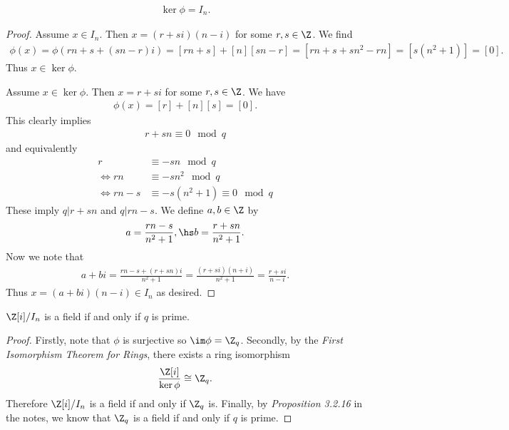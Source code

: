 \documentclass{article}
\begin{document}
\begin{claim*}[4]
   \begin{align*}
      \ker\phi = I_n.
   \end{align*} 
   \begin{proof}
      Assume $x\in I_n$. Then $x=(r+si)(n-i)$ for some $r,s\in\Z$. We find 
      \begin{align*}
         \phi(x)=\phi(rn + s + (sn - r)i) = [rn + s] + [n][sn -r] = [rn + s + sn^2 -rn] = [s(n^2+1)] = [0].
      \end{align*}
      Thus $x\in\ker\phi$.

      Assume $x\in\ker\phi$. Then $x=r+si$ for some $r,s\in\Z$. We have
      \begin{align*}
         \phi(x) = [r] + [n][s] = [0].
      \end{align*}
      This clearly implies 
      \begin{align*}
         r + sn \equiv 0 \mod q
      \end{align*}
      and equivalently 
      \begin{align*}
         r &\equiv -sn \mod q\\
         \Leftrightarrow rn &\equiv -sn^2 \mod q\\
         \Leftrightarrow rn - s &\equiv -s(n^2+1) \equiv 0 \mod q
      \end{align*}
      These imply $q|r+sn$ and $q|rn-s$. We define $a,b\in\Z$ by
      \begin{align*}
         a=\frac{rn-s}{n^2+1},\hs 
         b=\frac{r+sn}{n^2+1}.
      \end{align*}
      Now we note that 
      \begin{align*}
         a+bi=\frac{rn-s+(r+sn)i}{n^2+1}=\frac{(r+si)(n+i)}{n^2+1}=\frac{r+si}{n-i}.
      \end{align*}
      Thus $x=(a+bi)(n-i)\in I_n$ as desired.
   \end{proof}
\end{claim*}

\begin{claim*}[5]
   $\gaussint/I_n$ is a field if and only if $q$ is prime.   
   \begin{proof}
      Firstly, note that $\phi$ is surjective so $\im\phi=\Z_q$. Secondly, by the \emph{First Isomorphism
      Theorem for Rings}, there exists a ring isomorphism
      \begin{align*}
         \frac{\gaussint}{\ker\phi}\cong\Z_q. 
      \end{align*}
      Therefore $\gaussint/I_n$ is a field if and only if $\Z_q$ is.
      Finally, by \emph{Proposition 3.2.16} in the notes, we know that $\Z_q$ is a field if and only if $q$ is prime.
   \end{proof}
\end{claim*}
\end{document}
